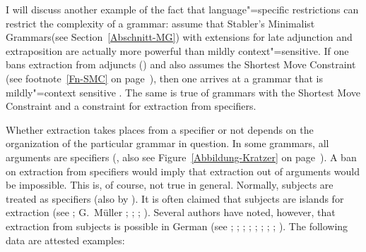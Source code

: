 I will discuss another example of the fact that language"=specific restrictions can restrict the complexity of a grammar:
\citet[Section~3.2]{GM2007a} assume that Stabler's Minimalist Grammars\indexmg (see
Section~\ref{Abschnitt-MG}) with extensions for late adjunction and extraposition are actually more powerful than mildly context"=sensitive.
If one bans extraction from adjuncts (\citealp[]{FG2002a}) and also assumes the Shortest Move Constraint (see footnote~\ref{Fn-SMC} on page~\pageref{Fn-SMC}), then one arrives at a grammar that is mildly"=context sensitive
\citep[]{GM2007a}.
The same is true of grammars with the Shortest Move Constraint and a constraint for extraction from specifiers.

Whether extraction takes places from a specifier or not depends on the organization of the particular grammar in question.
In some grammars, all arguments are specifiers (\citealp[--123]{Kratzer96a}, also see
Figure~\ref{Abbildung-Kratzer} on page~\pageref{Abbildung-Kratzer}). A ban on extraction from
specifiers would imply that extraction out of arguments would be impossible. This is, of course, not
true in general. Normally, subjects are treated as specifiers (also by \citealp[]{FG2002a}). It is often claimed that subjects
are islands for extraction (see \citealp[, ]{Grewendorf89a}; G.\ Müller %
\citeyear[]{GMueller96b}; \citeyear[, ]{GMueller98a};
%
\citealp[]{Sabel99a}; \citealp[]{Fanselow2001a}).
Several\label{page-extraction-out-of-subjects} authors have noted, however, that extraction from subjects is possible in German (see \citealp[]{Duerscheid89a}; \citealp*[]{Haider93a};
\citealp{Pafel93b-u}; \citealp[]{Fortmann96a-u}; \citealp[]{Suchsland97a};
\citealp[]{VS98a}; \citealp[]{Ballweg97a}; \citealp[--101]{Mueller99a}; \citealp[]{deKuthy2002a}).
The following data are attested examples:%
